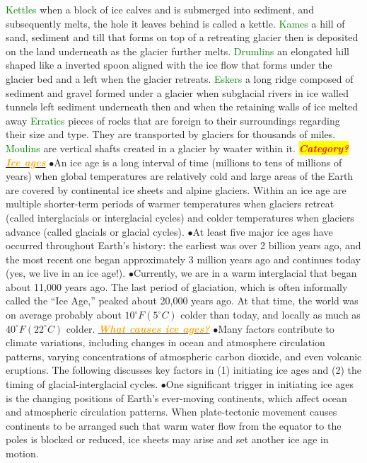 \documentclass{article}
\newcommand{\ddd}{$\bullet$}
\newcommand{\red}[1]{\textcolor{red}{#1}}
\newcommand{\green}[1]{\textcolor{green}{#1}}
\newcommand{\orange}[1]{\textcolor{orange}{#1}}
\newcommand{\mysection}[1]{\colorbox{yellow}{\textbf{\textit{\red{#1}}}}}
\newcommand{\mysub}[1]{\underline{\textbf{{\textit{\orange{#1}}}}}}
\newcommand{\mysubsub}[1]{{{\green{#1}}}}
\begin{document}
\begin{multicols*}{4}
			\mysubsub{Kettles} when a block of ice calves and is submerged into sediment, and subsequently melts, the hole it leaves behind is called a kettle.
			\mysubsub{Kames} a hill of sand, sediment and till that forms on top of a retreating glacier then is deposited on the land underneath as the glacier further melts.
			\mysubsub{Drumlins} an elongated hill shaped like a inverted spoon aligned with the ice flow that forms under the glacier bed and a left when the glacier retreats.
			\mysubsub{Eskers} a long ridge composed of sediment and gravel formed under a glacier when subglacial rivers in ice walled tunnels left sediment underneath then and when the retaining walls of ice melted away
			\mysubsub{Erratics} pieces of rocks that are foreign to their surroundings regarding their size and type. They are transported by glaciers for thousands of miles.
			\mysubsub{Moulins} are vertical shafts created in a glacier by waater within it.
        \mysection{Category?}
            \mysub{Ice ages}
                \ddd An ice age is a long interval of time (millions to tens of millions of years) when global temperatures are relatively cold and large areas of the Earth are covered by continental ice sheets and alpine glaciers. Within an ice age are multiple shorter-term periods of warmer temperatures when glaciers retreat (called interglacials or interglacial cycles) and colder temperatures when glaciers advance (called glacials or glacial cycles).
                \ddd At least five major ice ages have occurred throughout Earth’s history: the earliest was over 2 billion years ago, and the most recent one began approximately 3 million years ago and continues today (yes, we live in an ice age!).
                \ddd Currently, we are in a warm interglacial that began about 11,000 years ago. The last period of glaciation, which is often informally called the “Ice Age,” peaked about 20,000 years ago. At that time, the world was on average probably about $ 10^\circ F (5^\circ C) $ colder than today, and locally as much as $ 40^\circ F (22^\circ C) $ colder.
            \mysub{What causes ice ages?}
                \ddd Many factors contribute to climate variations, including changes in ocean and atmosphere circulation patterns, varying concentrations of atmospheric carbon dioxide, and even volcanic eruptions. The following discusses key factors in (1) initiating ice ages and (2) the timing of glacial-interglacial cycles.
                \ddd One significant trigger in initiating ice ages is the changing positions of Earth’s ever-moving continents, which affect ocean and atmospheric circulation patterns. When plate-tectonic movement causes continents to be arranged such that warm water flow from the equator to the poles is blocked or reduced, ice sheets may arise and set another ice age in motion.

\end{multicols*}
\end{document}
